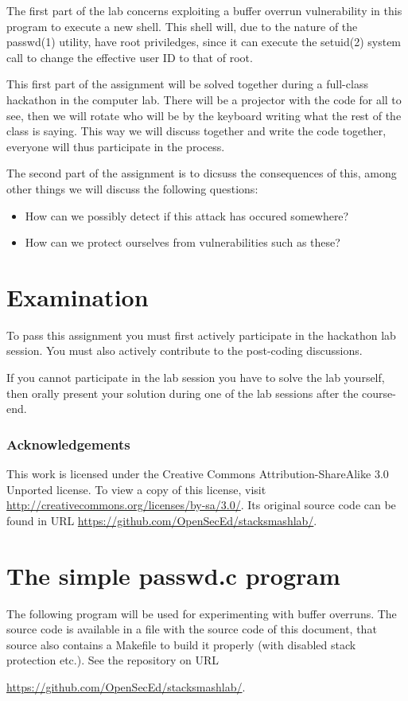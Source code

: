 The first part of the lab concerns exploiting a buffer overrun vulnerability in 
this program to execute a new shell.
This shell will, due to the nature of the passwd(1) utility, have root 
priviledges, since it can execute the setuid(2) system call to change the 
effective user ID to that of root.

This first part of the assignment will be solved together during a full-class 
hackathon in the computer lab.
There will be a projector with the code for all to see, then we will rotate who 
will be by the keyboard writing what the rest of the class is saying.
This way we will discuss together and write the code together, everyone will 
thus participate in the process.

The second part of the assignment is to dicsuss the consequences of this, among 
other things we will discuss the following questions:
\begin{itemize}
  \item How can we possibly detect if this attack has occured somewhere?
  \item How can we protect ourselves from vulnerabilities such as these?
\end{itemize}


\section{Examination}
\label{sec:exam}
To pass this assignment you must first actively participate in the hackathon 
lab session.
You must also actively contribute to the post-coding discussions.

If you cannot participate in the lab session you have to solve the lab 
yourself, then orally present your solution during one of the lab sessions 
after the course-end.


\subsubsection*{Acknowledgements}

This work is licensed under the Creative Commons Attribution-ShareAlike 3.0 
Unported license.
To view a copy of this license, visit 
\url{http://creativecommons.org/licenses/by-sa/3.0/}.
Its original source code can be found in URL 
\url{https://github.com/OpenSecEd/stacksmashlab/}.


\printbibliography{}


\appendix
\section{The simple passwd.c program}
\label{app:passwdsrc}
The following program will be used for experimenting with buffer overruns.
The source code is available in a file with the source code of this document, 
that source also contains a Makefile to build it properly (with disabled stack 
protection etc.).
See the repository on URL
\begin{center}
  \url{https://github.com/OpenSecEd/stacksmashlab/}.
\end{center}



